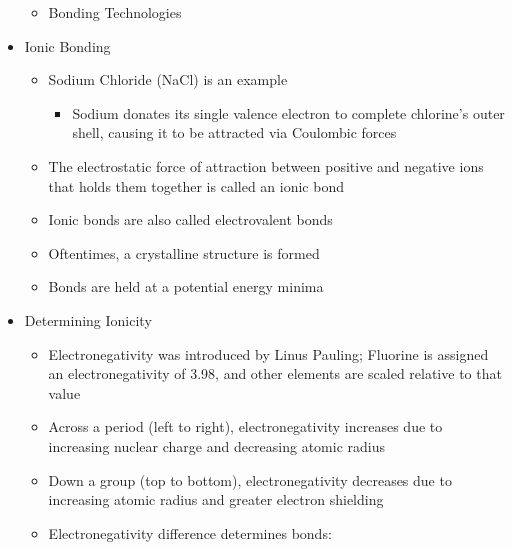 \begin{itemize}
\begin{itemize}
      \item Bonding Technologies

    \end{itemize}

  \item Ionic Bonding

    \begin{itemize}

      \item Sodium Chloride (NaCl) is an example

        \begin{itemize}

          \item Sodium donates its single valence electron to complete chlorine's outer shell, causing it to be attracted via Coulombic forces

        \end{itemize}

      \item The electrostatic force of attraction between positive and negative ions that holds them together is called an ionic bond

      \item Ionic bonds are also called electrovalent bonds

      \item Oftentimes, a crystalline structure is formed

      \item Bonds are held at a potential energy minima

    \end{itemize}

  \item Determining Ionicity

    \begin{itemize}

      \item Electronegativity was introduced by Linus Pauling; Fluorine is assigned an electronegativity of 3.98, and other elements are scaled relative to that value

      \item Across a period (left to right), electronegativity increases due to increasing nuclear charge and decreasing atomic radius

      \item Down a group (top to bottom), electronegativity decreases due to increasing atomic radius and greater electron shielding

      \item Electronegativity difference determines bonds:


\end{itemize}
\end{itemize}
